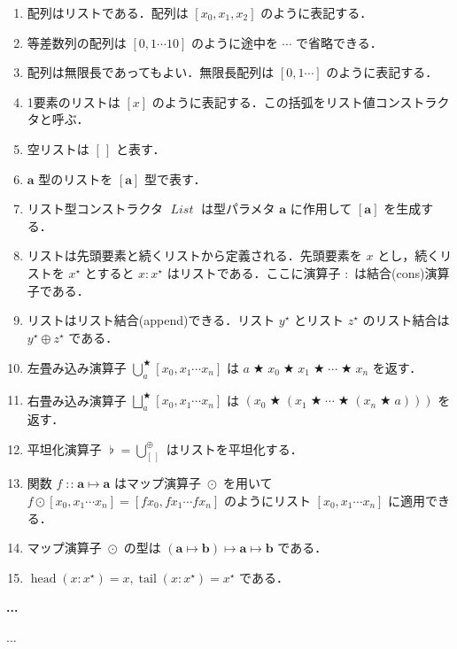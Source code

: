 \documentclass[a4paper,twocolumn]{jsbook}
\newenvironment{note}[1]{\begin{boxnote}\begin{center}\textbf{#1}\end{center}}{\end{boxnote}}
\newcommand{\mEmptyList}{{[\,]}}
\newcommand{\mSpecialFunc}[1]{\mathrm{#1}}
\DeclareMathOperator{\mHead}{\mSpecialFunc{head}}
\DeclareMathOperator{\mTail}{\mSpecialFunc{tail}}
\DeclareMathOperator{\mAppend}{\oplus}
\DeclareMathOperator{\mBinOp}{\bigstar}
\DeclareMathOperator{\mConcat}{\flat}
\DeclareMathOperator*{\mFold}{\bigcup}
\DeclareMathOperator*{\mFoldRight}{\bigsqcup}
\DeclareMathOperator{\mIn}{{:\!:}}
\DeclareMathOperator{\mMapList}{\odot}
\DeclareMathOperator{\mMapsTo}{\mapsto}
\newcommand{\mType}[1]{\mathbf{#1}}
\newcommand{\mListType}[1]{[\mType{#1}]}
\newcommand{\mTypeConstructor}[1]{\textit{#1}}
\DeclareMathOperator{\mListTypeConstructor}{\mTypeConstructor{List}}
\newcommand{\mListWith}[1]{\left[#1\right]}
\newcommand{\mList}[1]{{#1}^\mathrm{\star}}
\newcommand{\mProj}[2]{#1\mMapsTo#2}
\begin{document}
\begin{enumerate}
\item 配列はリストである．配列は $\mListWith{x_0,x_1,x_2}$ のように表記する．
\item 等差数列の配列は $\mListWith{0,1\dotsb10}$ のように途中を $\dotsb$ で省略できる．
\item 配列は無限長であってもよい．無限長配列は $\mListWith{0,1\dotsb}$ のように表記する．
\item 1要素のリストは $\mListWith{x}$ のように表記する．この括弧をリスト値コンストラクタと呼ぶ．
\item 空リストは $\mEmptyList$ と表す．
\item $\mType{a}$ 型のリストを $\mListType{a}$ 型で表す．
\item リスト型コンストラクタ $\mListTypeConstructor$ は型パラメタ $\mType{a}$ に作用して $\mListType{a}$ を生成する．
\item リストは先頭要素と続くリストから定義される．先頭要素を $x$ とし，続くリストを $\mList{x}$ とすると $x:\mList{x}$ はリストである．ここに演算子 $:$ は結合(cons)演算子である．
\item リストはリスト結合(append)できる．リスト $\mList{y}$ とリスト $\mList{z}$ のリスト結合は $\mList{y}\mAppend\mList{z}$ である．
\item 左畳み込み演算子 $\mFold^{\mBinOp}_a\mListWith{x_0,x_1\dotsb x_n}$ は $a\mBinOp x_0\mBinOp x_1\mBinOp\dotsb\mBinOp x_n$ を返す．
\item 右畳み込み演算子 $\mFoldRight^{\mBinOp}_{a}\mListWith{x_0,x_1\dotsb x_n}$ は
 $(x_0\mBinOp(x_1\mBinOp\dotsb\mBinOp(x_n\mBinOp a)))$ を返す．
\item 平坦化演算子 $\mConcat=\mFold_\mEmptyList^{\mAppend}$ はリストを平坦化する．
\item 関数 $f\mIn\mProj{\mType{a}}{\mType{a}}$ はマップ演算子 $\mMapList$ を用いて $f\mMapList\mListWith{x_0,x_1\dotsb x_n}=\mListWith{fx_0,fx_1\dotsb fx_n}$ のようにリスト $\mListWith{x_0,x_1\dotsb x_n}$ に適用できる．
\item マップ演算子 $\mMapList$ の型は $\mProj{(\mProj{\mType{a}}{\mType{b}})}{\mProj{\mType{a}}{\mType{b}}}$ である．
\item $\mHead(x:\mList{x})=x,\mTail(x:\mList{x})=\mList{x}$ である．
\end{enumerate}


\begin{note}{...}
...
\end{note}
\end{document}
